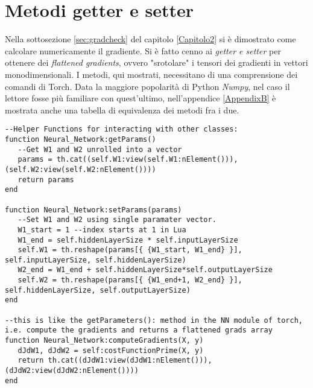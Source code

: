\section{Metodi getter e setter}
Nella sottosezione \ref{sec:gradcheck} del capitolo \ref{Capitolo2} si è dimostrato come calcolare numericamente il gradiente. Si è fatto cenno ai \emph{getter e setter} per ottenere dei \emph{flattened gradients}, ovvero "srotolare" i tensori dei gradienti in vettori monodimensionali. I metodi, qui mostrati, necessitano di una comprensione dei comandi di Torch. Data la maggiore popolarità di Python \emph{Numpy}, nel caso il lettore fosse più familiare con quest'ultimo, nell'appendice \ref{AppendixB} è mostrata anche una tabella di equivalenza dei metodi fra i due. 
\begin{lstlisting}[language={[5.2]Lua}]
--Helper Functions for interacting with other classes:
function Neural_Network:getParams()
   --Get W1 and W2 unrolled into a vector
   params = th.cat((self.W1:view(self.W1:nElement())), (self.W2:view(self.W2:nElement())))
   return params
end

function Neural_Network:setParams(params)
   --Set W1 and W2 using single paramater vector.
   W1_start = 1 --index starts at 1 in Lua
   W1_end = self.hiddenLayerSize * self.inputLayerSize
   self.W1 = th.reshape(params[{ {W1_start, W1_end} }], self.inputLayerSize, self.hiddenLayerSize)
   W2_end = W1_end + self.hiddenLayerSize*self.outputLayerSize
   self.W2 = th.reshape(params[{ {W1_end+1, W2_end} }], self.hiddenLayerSize, self.outputLayerSize)
end

--this is like the getParameters(): method in the NN module of torch, i.e. compute the gradients and returns a flattened grads array
function Neural_Network:computeGradients(X, y)
   dJdW1, dJdW2 = self:costFunctionPrime(X, y)
   return th.cat((dJdW1:view(dJdW1:nElement())), (dJdW2:view(dJdW2:nElement())))
end
\end{lstlisting}
